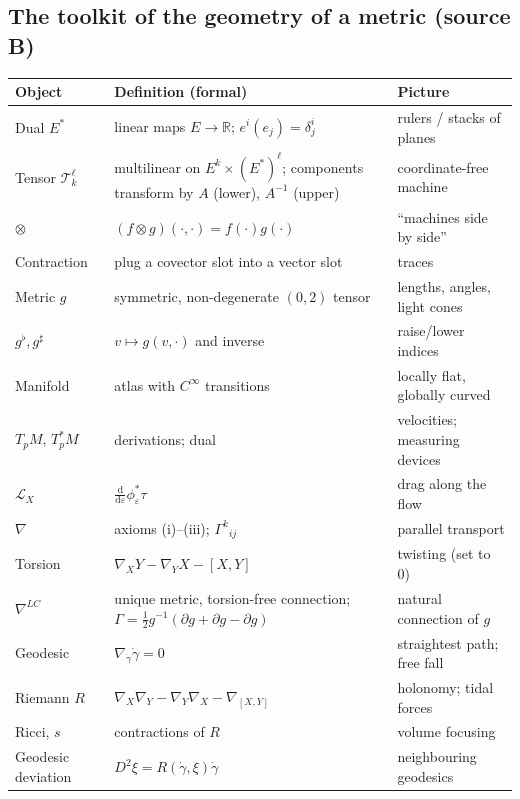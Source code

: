 \documentclass[11pt,a4paper]{article}
\numberwithin{equation}{section}
\theoremstyle{definition}
\theoremstyle{plain}
\newcommand{\R}{\mathbb{R}}
\newcommand{\dd}{\mathrm{d}}
\newcommand{\Lie}{\mathcal{L}}
\newcommand{\TT}[2]{\mathcal{T}^{#1}_{#2}}          %
\begin{document}
\subsection{The toolkit of the geometry of a metric (source B)}
\begin{center}
\small
\begin{tabular}{@{}p{3.1cm}p{6.2cm}p{5.4cm}@{}}
\toprule
\textbf{Object} & \textbf{Definition (formal)} & \textbf{Picture}\\ \midrule
Dual $E^*$ & linear maps $E\to\R$; $e^{i}(e_j)=\delta^i_j$ & rulers / stacks of planes\\
Tensor $\TT{\ell}{k}$ & multilinear on $E^k\times(E^*)^\ell$; components transform by $A$ (lower), $A^{-1}$ (upper) & coordinate-free machine\\
$\otimes$ & $(f\otimes g)(\cdot,\cdot)=f(\cdot)g(\cdot)$ & ``machines side by side''\\
Contraction & plug a covector slot into a vector slot & traces\\
Metric $g$ & symmetric, non-degenerate $(0,2)$ tensor & lengths, angles, light cones\\
$g^\flat,g^\sharp$ & $v\mapsto g(v,\cdot)$ and inverse & raise/lower indices\\
Manifold & atlas with $C^\infty$ transitions & locally flat, globally curved\\
$T_pM$, $T^*_pM$ & derivations; dual & velocities; measuring devices\\
$\Lie_X$ & $\frac{\dd}{\dd\varepsilon}\phi_\varepsilon^*\tau$ & drag along the flow\\
$\nabla$ & axioms (i)--(iii); $\Gamma^k{}_{ij}$ & parallel transport\\
Torsion & $\nabla_XY-\nabla_YX-[X,Y]$ & twisting (set to 0)\\
$\nabla^{LC}$ & unique metric, torsion-free connection; $\Gamma=\tfrac12g^{-1}(\partial g+\partial g-\partial g)$ & natural connection of $g$\\
Geodesic & $\nabla_{\dot\gamma}\dot\gamma=0$ & straightest path; free fall\\
Riemann $R$ & $\nabla_X\nabla_Y-\nabla_Y\nabla_X-\nabla_{[X,Y]}$ & holonomy; tidal forces\\
Ricci, $s$ & contractions of $R$ & volume focusing\\
Geodesic deviation & $D^2\xi=R(\dot\gamma,\xi)\dot\gamma$ & neighbouring geodesics\\ \bottomrule
\end{tabular}
\end{center}
\end{document}
